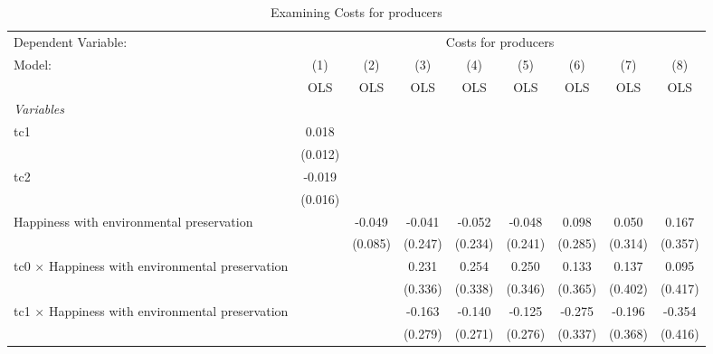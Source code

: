 
\begin{table}[htbp]
   \caption{Examining Costs for producers}
   \centering
   \begin{tabular}{lcccccccc}
      \toprule
      Dependent Variable: & \multicolumn{8}{c}{Costs for producers}\\
      Model:                                                  & (1)     & (2)     & (3)     & (4)     & (5)     & (6)     & (7)           & (8)\\  
                                                              &  OLS    & OLS     & OLS     & OLS     & OLS     & OLS     & OLS           & OLS\\  
      \midrule
      \emph{Variables}\\
      tc1                                                     & 0.018   &         &         &         &         &         &               &   \\   
                                                              & (0.012) &         &         &         &         &         &               &   \\   
      tc2                                                     & -0.019  &         &         &         &         &         &               &   \\   
                                                              & (0.016) &         &         &         &         &         &               &   \\   
      Happiness with environmental preservation               &         & -0.049  & -0.041  & -0.052  & -0.048  & 0.098   & 0.050         & 0.167\\   
                                                              &         & (0.085) & (0.247) & (0.234) & (0.241) & (0.285) & (0.314)       & (0.357)\\   
      tc0 $\times$ Happiness with environmental preservation  &         &         & 0.231   & 0.254   & 0.250   & 0.133   & 0.137         & 0.095\\   
                                                              &         &         & (0.336) & (0.338) & (0.346) & (0.365) & (0.402)       & (0.417)\\   
      tc1 $\times$ Happiness with environmental preservation  &         &         & -0.163  & -0.140  & -0.125  & -0.275  & -0.196        & -0.354\\   
                                                              &         &         & (0.279) & (0.271) & (0.276) & (0.337) & (0.368)       & (0.416)\\   

\end{tabular}
\end{table}
